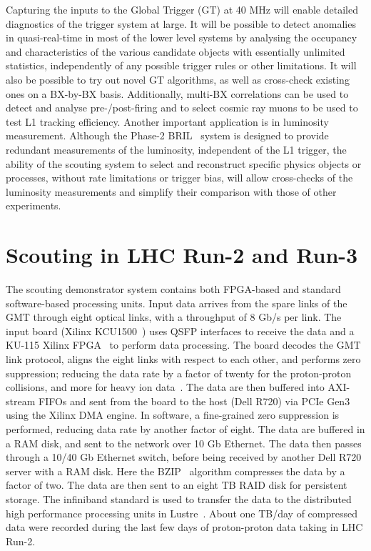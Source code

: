 \documentclass[10pt, paper=a4, UKenglish]{article}
\begin{document}
Capturing the inputs to the Global Trigger (GT) at 40 MHz will enable detailed diagnostics of the trigger system at large. It will be possible to detect anomalies in quasi-real-time in most of the lower level systems by analysing the occupancy and characteristics of the various candidate objects with essentially unlimited statistics, independently of any possible trigger rules or other limitations. It will also be possible to try out novel GT algorithms, as well as cross-check existing ones on a BX-by-BX basis. Additionally, multi-BX correlations can be used to detect and analyse pre-/post-firing and to select cosmic ray muons to be used to test L1 tracking efficiency. Another important application is in luminosity measurement. Although the Phase-2 BRIL~\cite{BRIL} system is designed to provide redundant measurements of the luminosity, independent of the L1 trigger, the ability of the scouting system to select and reconstruct specific physics objects or processes, without rate limitations or trigger bias, will allow cross-checks of the luminosity measurements and simplify their comparison with those of other experiments.

\section{Scouting in LHC Run-2 and Run-3}
\label{Scouting in Run-2 and Run-3}

The scouting demonstrator system contains both FPGA-based and standard software-based processing units. Input data arrives from the spare links of the GMT through eight optical links, with a throughput of 8 Gb/s per link. The input board (Xilinx KCU1500~\cite{kcu}) uses QSFP interfaces to receive the data and a KU-115 Xilinx FPGA~\cite{ku115} to perform data processing. The board decodes the GMT link protocol, aligns the eight links with respect to each other, and performs zero suppression; reducing the data rate by a factor of twenty for the proton-proton collisions, and more for heavy ion data~\cite{hannes}. The data are then buffered into AXI-stream FIFOs and sent from the board to the host (Dell R720) via PCIe Gen3 using the Xilinx DMA engine. In software, a fine-grained zero suppression is performed, reducing data rate by another factor of eight. The data are buffered in a RAM disk, and sent to the network over 10 Gb Ethernet. The data then passes through a 10/40 Gb Ethernet switch, before being received by another Dell R720 server with a RAM disk. Here the BZIP~\cite{bzip} algorithm compresses the data by a factor of two. The data are then sent to an eight TB RAID disk for persistent storage. The infiniband standard is used to transfer the data to the distributed high performance processing units in Lustre~\cite{lustre}. About one TB/day of compressed data were recorded during the last few days of proton-proton data taking in LHC Run-2.
\end{document}
